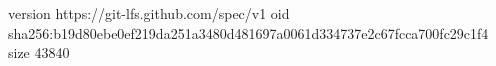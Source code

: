 version https://git-lfs.github.com/spec/v1
oid sha256:b19d80ebe0ef219da251a3480d481697a0061d334737e2c67fcca700fc29c1f4
size 43840
